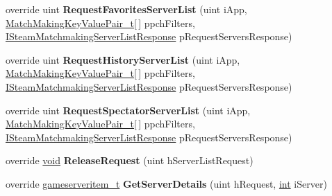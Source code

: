 \begin{DoxyCompactItemize}
\item 
\hypertarget{classValve_1_1Steamworks_1_1CSteamMatchmakingServers_a949877a54135b4ec05bbf610d382e090}{}override uint {\bfseries Request\+Favorites\+Server\+List} (uint i\+App, \hyperlink{structValve_1_1Steamworks_1_1MatchMakingKeyValuePair__t}{Match\+Making\+Key\+Value\+Pair\+\_\+t}\mbox{[}$\,$\mbox{]} ppch\+Filters, \hyperlink{classValve_1_1Steamworks_1_1ISteamMatchmakingServerListResponse}{I\+Steam\+Matchmaking\+Server\+List\+Response} p\+Request\+Servers\+Response)\label{classValve_1_1Steamworks_1_1CSteamMatchmakingServers_a949877a54135b4ec05bbf610d382e090}

\item 
\hypertarget{classValve_1_1Steamworks_1_1CSteamMatchmakingServers_aad96eddadedd12d387e0034fb170a6f4}{}override uint {\bfseries Request\+History\+Server\+List} (uint i\+App, \hyperlink{structValve_1_1Steamworks_1_1MatchMakingKeyValuePair__t}{Match\+Making\+Key\+Value\+Pair\+\_\+t}\mbox{[}$\,$\mbox{]} ppch\+Filters, \hyperlink{classValve_1_1Steamworks_1_1ISteamMatchmakingServerListResponse}{I\+Steam\+Matchmaking\+Server\+List\+Response} p\+Request\+Servers\+Response)\label{classValve_1_1Steamworks_1_1CSteamMatchmakingServers_aad96eddadedd12d387e0034fb170a6f4}

\item 
\hypertarget{classValve_1_1Steamworks_1_1CSteamMatchmakingServers_ab36b33ef8c971d4bb2462a0d011e0152}{}override uint {\bfseries Request\+Spectator\+Server\+List} (uint i\+App, \hyperlink{structValve_1_1Steamworks_1_1MatchMakingKeyValuePair__t}{Match\+Making\+Key\+Value\+Pair\+\_\+t}\mbox{[}$\,$\mbox{]} ppch\+Filters, \hyperlink{classValve_1_1Steamworks_1_1ISteamMatchmakingServerListResponse}{I\+Steam\+Matchmaking\+Server\+List\+Response} p\+Request\+Servers\+Response)\label{classValve_1_1Steamworks_1_1CSteamMatchmakingServers_ab36b33ef8c971d4bb2462a0d011e0152}

\item 
\hypertarget{classValve_1_1Steamworks_1_1CSteamMatchmakingServers_a8ac772614b22ad6e881745f8eef27f7b}{}override \hyperlink{SDL__audio_8h_a52835ae37c4bb905b903cbaf5d04b05f}{void} {\bfseries Release\+Request} (uint h\+Server\+List\+Request)\label{classValve_1_1Steamworks_1_1CSteamMatchmakingServers_a8ac772614b22ad6e881745f8eef27f7b}

\item 
\hypertarget{classValve_1_1Steamworks_1_1CSteamMatchmakingServers_a3994cb71dc758750855a96c5023dd910}{}override \hyperlink{structValve_1_1Steamworks_1_1gameserveritem__t}{gameserveritem\+\_\+t} {\bfseries Get\+Server\+Details} (uint h\+Request, \hyperlink{SDL__thread_8h_a6a64f9be4433e4de6e2f2f548cf3c08e}{int} i\+Server)\label{classValve_1_1Steamworks_1_1CSteamMatchmakingServers_a3994cb71dc758750855a96c5023dd910}


\end{DoxyCompactItemize}
